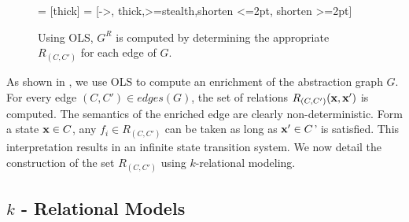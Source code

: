 \begin{figure}[!htbp]
\begin{center}
 = [thick]
 = [->, thick,>=stealth,shorten <=2pt, shorten >=2pt]
\end{center}
\vspace*{-.3cm}
\caption{Using OLS, $G^R$ is computed by determining the appropriate
$R_{(C,C')}$ for each edge of $G$.}
\label{fig:enrichment}
\vspace*{-.3cm}
\end{figure}

As shown in , we use OLS to compute an enrichment
of the abstraction graph $G$. For every edge $(C,C') \in edges(G)$,
the set of relations $R_{(C,C')}(\mathbf{x},\mathbf{x}')$ is computed. The semantics
of the enriched edge are clearly non-deterministic. Form a state $\mathbf{x}
\in C$, any $f_i\in R_{(C,C')}$ can be taken as long as $\mathbf{x}' \in C$'
is satisfied. This interpretation results in an infinite state
transition system. We now detail the construction of the set
$R_{(C,C')}$ using $k$-relational modeling.



\subsection{$k$ - Relational Models}

